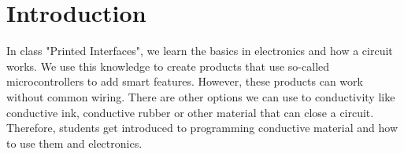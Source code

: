 \documentclass[00_doc.tex]{subfiles}
\begin{document}
    \section{Introduction}
    \begin{flushleft}
        In class "Printed Interfaces", we learn the basics in electronics and how a circuit works. We 
        use this knowledge to create products that use so-called microcontrollers to add smart features.
        However, these products can work without common wiring. There are other options we can use to 
        conductivity like conductive ink, conductive rubber or other material that can close a circuit. 
        Therefore, students get introduced to programming conductive material and how to use them
        and electronics.
    \end{flushleft}
\end{document}
